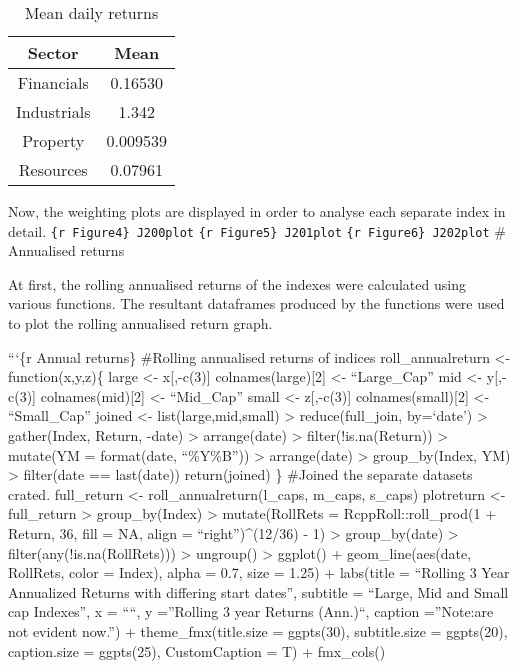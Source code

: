 \documentclass[
]{article}
\begin{document}
\begin{table}[h]
\begin{center}
    \begin{tabular}{| c | c |}
    \hline
        Sector & Mean \\
        \hline
        Financials & 0.16530 \\
        Industrials & 1.342 \\
        Property & 0.009539 \\
        Resources & 0.07961 \\
        \hline
    \end{tabular}
    \caption{Mean daily returns}
    \label{tab:Mean}
\end{center}
\end{table}

Now, the weighting plots are displayed in order to analyse each separate
index in detail. \texttt{\{r\ Figure4\}\ J200plot}
\texttt{\{r\ Figure5\}\ J201plot} \texttt{\{r\ Figure6\}\ J202plot} \#
Annualised returns

At first, the rolling annualised returns of the indexes were calculated
using various functions. The resultant dataframes produced by the
functions were used to plot the rolling annualised return graph.

```\{r Annual returns\} \#Rolling annualised returns of indices
roll\_annualreturn \textless- function(x,y,z)\{ large \textless-
x{[},-c(3){]} colnames(large){[}2{]} \textless- ``Large\_Cap'' mid
\textless- y{[},-c(3){]} colnames(mid){[}2{]} \textless- ``Mid\_Cap''
small \textless- z{[},-c(3){]} colnames(small){[}2{]} \textless-
``Small\_Cap'' joined \textless- list(large,mid,small)
\textbar\textgreater{} reduce(full\_join, by=`date')
\textbar\textgreater{} gather(Index, Return, -date)
\textbar\textgreater{} arrange(date) \textbar\textgreater{}
filter(!is.na(Return)) \textbar\textgreater{} mutate(YM = format(date,
``\%Y\%B'')) \textbar\textgreater{} arrange(date) \textbar\textgreater{}
group\_by(Index, YM) \textbar\textgreater{} filter(date == last(date))
return(joined) \} \#Joined the separate datasets crated. full\_return
\textless- roll\_annualreturn(l\_caps, m\_caps, s\_caps) plotreturn
\textless- full\_return \textbar\textgreater{} group\_by(Index)
\textbar\textgreater{} mutate(RollRets = RcppRoll::roll\_prod(1 +
Return, 36, fill = NA, align = ``right'')\^{}(12/36) - 1)
\textbar\textgreater{} group\_by(date) \textbar\textgreater{}
filter(any(!is.na(RollRets))) \textbar\textgreater{} ungroup()
\textbar\textgreater{} ggplot() + geom\_line(aes(date, RollRets, color =
Index), alpha = 0.7, size = 1.25) + labs(title = ``Rolling 3 Year
Annualized Returns with differing start dates'', subtitle = ``Large, Mid
and Small cap Indexes'', x = ````, y =''Rolling 3 year Returns (Ann.)``,
caption =''Note:\nDistortions are not evident now.'') +
theme\_fmx(title.size = ggpts(30), subtitle.size = ggpts(20),
caption.size = ggpts(25), CustomCaption = T) + fmx\_cols()
\end{document}
